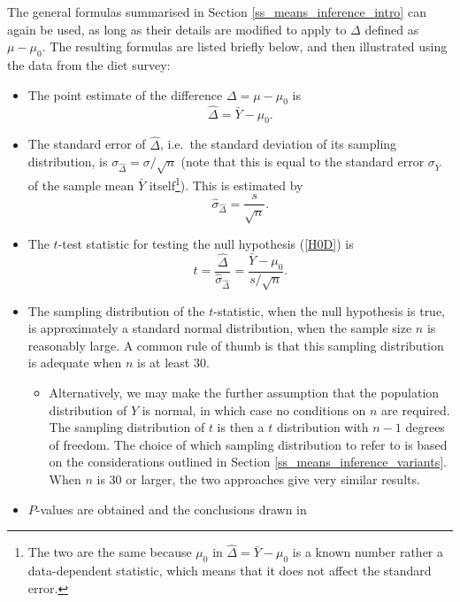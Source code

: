The general formulas summarised in Section
\ref{ss_means_inference_intro} can again be used,
as long as their details are modified to
apply to $\Delta$ defined as $\mu-\mu_{0}$. The resulting formulas are
listed briefly below, and then illustrated using the data from the diet
survey:
\begin{itemize}
\item
The point estimate of the difference $\Delta=\mu-\mu_{0}$ is
\begin{equation}
\hat{\Delta}=\bar{Y}-\mu_{0}.
\label{Dhat1}
\end{equation}
\item
The standard error of $\hat{\Delta}$, i.e.\ the standard deviation of
its sampling distribution, is $\sigma_{\hat{\Delta}}=\sigma/\sqrt{n}$
(note that this is equal to the standard error $\sigma_{\bar{Y}}$ of the
sample mean $\bar{Y}$ itself\footnote{The two are the same because
$\mu_{0}$ in $\hat{\Delta}=\bar{Y}-\mu_{0}$ is a known number rather a
data-dependent statistic, which means that it does not affect the
standard error.}). This is estimated by
\begin{equation}
\hat{\sigma}_{\hat{\Delta}} = \frac{s}{\sqrt{n}}.
\label{seDhat1}
\end{equation}
\item
The $t$-test statistic for testing the null hypothesis (\ref{H0D}) is
\begin{equation}
t=\frac{\hat{\Delta}}{\hat{\sigma}_{\hat{\Delta}}} =
\frac{\bar{Y}-\mu_{0}}{s/\sqrt{n}}.
\label{tD1}
\end{equation}
\item
The sampling distribution of the $t$-statistic, when the null hypothesis
is true, is approximately a standard normal distribution, when the
sample size $n$ is reasonably large. A common rule of thumb is that this
sampling distribution is adequate when $n$ is at least 30.
\begin{itemize}
\item
Alternatively, we may make the
further assumption that the population distribution of
$Y$ is normal, in which case no conditions on $n$ are required. The
sampling  distribution of $t$ is then a $t$ distribution with $n-1$ degrees of
freedom. The choice of which sampling distribution to refer to is
based on the considerations outlined in Section
\ref{ss_means_inference_variants}.
When $n$
is 30 or larger, the two approaches give very similar results.
\end{itemize}
\item
$P$-values are obtained and the conclusions drawn in

\end{itemize}
